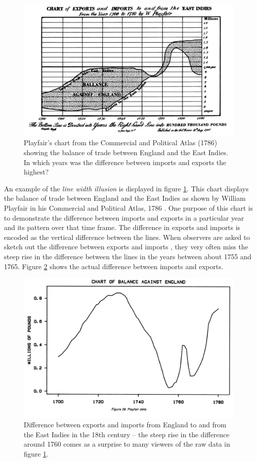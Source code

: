 \begin{figure}
\includegraphics[width=.9\linewidth]{images/playfair_east_indies_gross}
\caption{\label{playfair}
Playfair's chart from the Commercial and Political Atlas (1786) showing the balance of trade between England and the East Indies.  In which years was the difference between imports and exports the highest? }
\end{figure}
An example of the  {\it line width illusion} is displayed in  figure  \ref{playfair}. This chart displays the balance of trade between England and the East Indies as shown by William Playfair in his Commercial and Political Atlas, 1786 \cite{playfair, playfair2}.  One purpose of this chart is to demonstrate the difference between imports and exports in a particular year and its pattern over that time frame. The difference in exports and imports is encoded as the vertical difference between the lines. When observers are asked to sketch out the difference between exports and imports  \cite{cleveland:1984}, they very often  miss the steep rise in the difference between the lines in the years between about 1755 and 1765. Figure \ref{playfair2} shows the  actual difference between imports and exports. 



\begin{figure}
\centering
\includegraphics[width=.8\linewidth, height=.4\linewidth]{images/playfair_differenz_cleveland}
\caption{\label{playfair2}
Difference between exports and imports from England to and from the East Indies in the 18th century -- the steep rise in the difference around 1760  comes as a surprise to many viewers of the raw data in figure \ref{playfair}.  }
\end{figure}


